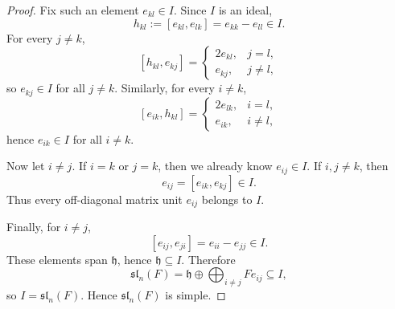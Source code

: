 \begin{proof}
    Fix such an element $e_{kl}\in I$. Since $I$ is an ideal,
    \[
        h_{kl}:=[e_{kl},e_{lk}]=e_{kk}-e_{ll}\in I.
    \]
    For every $j\neq k$,
    \[
        [h_{kl},e_{kj}]=
        \begin{cases}
            2e_{kl}, & j=l,     \\
            e_{kj},  & j\neq l,
        \end{cases}
    \]
    so $e_{kj}\in I$ for all $j\neq k$. Similarly, for every $i\neq k$,
    \[
        [e_{ik},h_{kl}]=
        \begin{cases}
            2e_{lk}, & i=l,     \\
            e_{ik},  & i\neq l,
        \end{cases}
    \]
    hence $e_{ik}\in I$ for all $i\neq k$.

    Now let $i\neq j$. If $i=k$ or $j=k$, then we already know $e_{ij}\in I$. If $i,j\neq k$, then
    \[
        e_{ij}=[e_{ik},e_{kj}]\in I.
    \]
    Thus every off-diagonal matrix unit $e_{ij}$ belongs to $I$.

    Finally, for $i\neq j$,
    \[
        [e_{ij},e_{ji}]=e_{ii}-e_{jj}\in I.
    \]
    These elements span $\mathfrak{h}$, hence $\mathfrak{h}\subseteq I$. Therefore
    \[
        \mathfrak{sl}_n(F)=\mathfrak{h}\oplus \bigoplus_{i\neq j}Fe_{ij}\subseteq I,
    \]
    so $I=\mathfrak{sl}_n(F)$. Hence $\mathfrak{sl}_n(F)$ is simple.
\end{proof}

